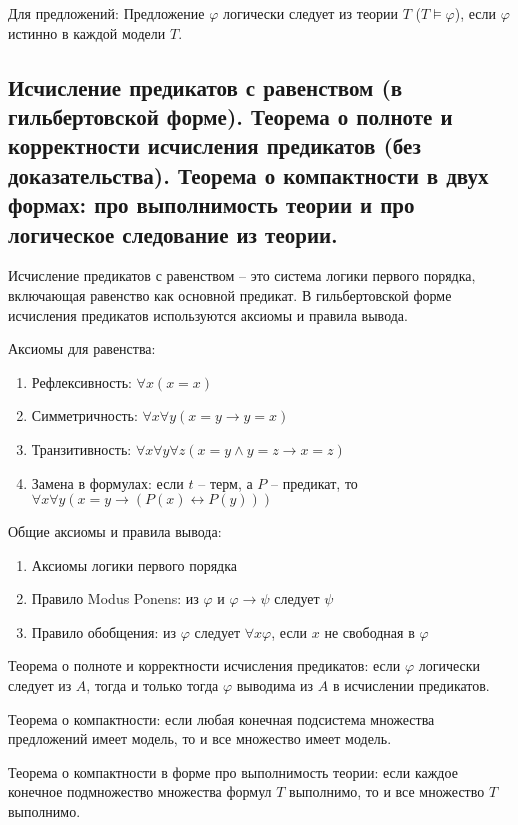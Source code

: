 \documentclass[a4paper, 10pt]{article}
\begin{document}
Для предложений: Предложение $\varphi$ логически следует из теории $T$ ($T\models\varphi$), если $\varphi$ истинно в каждой модели $T$.

\subsection{Исчисление предикатов с равенством (в гильбертовской форме). Теорема о полноте и корректности исчисления предикатов (без доказательства). Теорема о компактности в двух формах: про выполнимость теории и про логическое следование из теории.}

Исчисление предикатов с равенством -- это система логики первого порядка, включающая равенство как основной предикат. В гильбертовской форме исчисления предикатов используются аксиомы и правила вывода.

Аксиомы для равенства:

\begin{enumerate}
    \item Рефлексивность: $\forall x (x=x)$
    \item Симметричность: $\forall x \forall y (x=y \to y=x)$
    \item Транзитивность: $\forall x\forall y\forall z (x=y\land y=z \to x=z)$
    \item Замена в формулах: если $t$ -- терм, а $P$ -- предикат, то $\forall x\forall y (x=y \to (P(x)\leftrightarrow P(y)))$
\end{enumerate}

Общие аксиомы и правила вывода:

\begin{enumerate}
    \item Аксиомы логики первого порядка
    \item Правило Modus Ponens: из $\varphi$ и $\varphi\to\psi$ следует $\psi$
    \item Правило обобщения: из $\varphi$ следует $\forall x\varphi$, если $x$ не свободная в $\varphi$
\end{enumerate}

Теорема о полноте и корректности исчисления предикатов: если $\varphi$ логически следует из $A$, тогда и только тогда $\varphi$ выводима из $A$ в исчислении предикатов.

\hfill

Теорема о компактности: если любая конечная подсистема множества предложений имеет модель, то и все множество имеет модель.

Теорема о компактности в форме про выполнимость теории: если каждое конечное подмножество множества формул $T$ выполнимо, то и все множество $T$ выполнимо.
\end{document}
